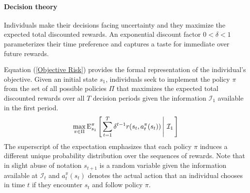 \paragraph{Decision theory} Individuals make their decisions facing uncertainty and they maximize the expected total discounted rewards. An exponential discount factor $0 < \delta < 1$ parameterizes their time preference and captures a taste for immediate over future rewards.

Equation (\ref{Objective Risk}) provides the formal representation of the individual's objective. Given an initial state $s_1$, individuals seek to implement the policy $\pi$ from the set of all possible policies $\Pi$ that maximizes the expected total discounted rewards over all $T$ decision periods given the information $\mathcal{I}_1$ available in the first period.
%
\begin{align}\label{Objective Risk}
\max_{\pi \in\Pi} \mathrm{E}_{s_1}^\pi\left[\left.\sum^{T}_{t = 1}  \delta^{t - 1} r(s_t, a^\pi_t(s_t))\,\right\vert\,\mathcal{I}_1\,\right]
\end{align}
%
The superscript of the expectation emphasizes that each policy $\pi$ induces a different unique probability distribution over the sequences of rewards. Note that in slight abuse of notation $s_{t + 1}$ is a random variable given the information available at $\mathcal{I}_t$ and $a^\pi_{t}(s_{t})$ denotes the actual action that an individual chooses in time $t$ if they encounter $s_{t}$ and follow policy $\pi$.
